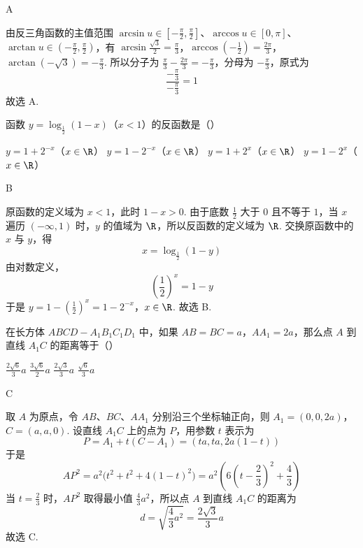 \begin{answer}
A
\end{answer}

\begin{solution}
由反三角函数的主值范围 \(\arcsin u\in[-\frac\pi2,\frac\pi2]\)、\(\arccos u\in[0,\pi]\)、\(\arctan u\in(-\frac\pi2,\frac\pi2)\)，有
\(\arcsin\frac{\sqrt{3}}2=\frac\pi3\)，\(\arccos\left(-\frac12\right)=\frac{2\pi}3\)，\(\arctan(-\sqrt{3})=-\frac\pi3\).
所以分子为 \(\frac\pi3-\frac{2\pi}3=-\frac\pi3\)，分母为 \(-\frac\pi3\)，原式为
\[
\frac{-\frac\pi3}{-\frac\pi3}=1
\]
故选 A.
\end{solution}

\begin{problem}
函数 \(y=\log_{\frac{1}{2}}(1-x)\)（\(x<1\)）的反函数是（\quad）

\choices
    {\(y=1+2^{-x}\)（\(x\in\R\)）}
    {\(y=1-2^{-x}\)（\(x\in\R\)）}
    {\(y=1+2^x\)（\(x\in\R\)）}
    {\(y=1-2^x\)（\(x\in\R\)）}
\end{problem}

\begin{answer}
B
\end{answer}

\begin{solution}
原函数的定义域为 \(x<1\)，此时 \(1-x>0\). 由于底数 \(\frac12\) 大于 \(0\) 且不等于 \(1\)，当 \(x\) 遍历 \((-\infty,1)\) 时，\(y\) 的值域为 \(\R\)，所以反函数的定义域为 \(\R\). 交换原函数中的 \(x\) 与 \(y\)，得
\[
x=\log_{\frac12}(1-y)
\]
由对数定义，
\[
\left(\frac12\right)^x=1-y
\]
于是
\(y=1-\left(\frac12\right)^x=1-2^{-x}\)，\(x\in\R\).
故选 B.
\end{solution}

\begin{problem}
在长方体 \(ABCD-A_1B_1C_1D_1\) 中，如果 \(AB=BC=a\)，\(AA_1=2a\)，那么点 \(A\) 到直线 \(A_1C\) 的距离等于（\quad）

\choices
    {\(\frac{2\sqrt{6}}{3}a\)}
    {\(\frac{3\sqrt{6}}{2}a\)}
    {\(\frac{2\sqrt{3}}{3}a\)}
    {\(\frac{\sqrt{6}}{3}a\)}
\end{problem}

\begin{answer}
C
\end{answer}

\begin{solution}
取 \(A\) 为原点，令 \(AB\)、\(BC\)、\(AA_1\) 分别沿三个坐标轴正向，则
\(A_1=(0,0,2a)\)，\(C=(a,a,0)\).
设直线 \(A_1C\) 上的点为 \(P\)，用参数 \(t\) 表示为
\[
P=A_1+t(C-A_1)=(ta,ta,2a(1-t))
\]
于是
\[
AP^2=a^2\bigl(t^2+t^2+4(1-t)^2\bigr)
=a^2\left(6\left(t-\frac23\right)^2+\frac43\right)
\]
当 \(t=\frac23\) 时，\(AP^2\) 取得最小值 \(\frac43a^2\)，所以点 \(A\) 到直线 \(A_1C\) 的距离为
\[
d=\sqrt{\frac43a^2}=\frac{2\sqrt{3}}3a
\]
故选 C.
\end{solution}


